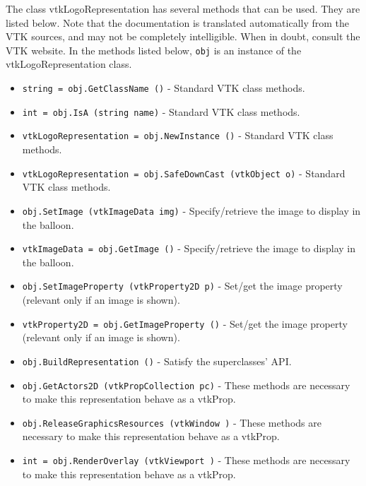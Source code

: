 The class vtkLogoRepresentation has several methods that can be used.
  They are listed below.
Note that the documentation is translated automatically from the VTK sources,
and may not be completely intelligible.  When in doubt, consult the VTK website.
In the methods listed below, \verb|obj| is an instance of the vtkLogoRepresentation class.
\begin{itemize}
\item  \verb|string = obj.GetClassName ()| -  Standard VTK class methods.

\item  \verb|int = obj.IsA (string name)| -  Standard VTK class methods.

\item  \verb|vtkLogoRepresentation = obj.NewInstance ()| -  Standard VTK class methods.

\item  \verb|vtkLogoRepresentation = obj.SafeDownCast (vtkObject o)| -  Standard VTK class methods.

\item  \verb|obj.SetImage (vtkImageData img)| -  Specify/retrieve the image to display in the balloon.

\item  \verb|vtkImageData = obj.GetImage ()| -  Specify/retrieve the image to display in the balloon.

\item  \verb|obj.SetImageProperty (vtkProperty2D p)| -  Set/get the image property (relevant only if an image is shown).

\item  \verb|vtkProperty2D = obj.GetImageProperty ()| -  Set/get the image property (relevant only if an image is shown).

\item  \verb|obj.BuildRepresentation ()| -  Satisfy the superclasses' API.

\item  \verb|obj.GetActors2D (vtkPropCollection pc)| -  These methods are necessary to make this representation behave as
 a vtkProp.

\item  \verb|obj.ReleaseGraphicsResources (vtkWindow )| -  These methods are necessary to make this representation behave as
 a vtkProp.

\item  \verb|int = obj.RenderOverlay (vtkViewport )| -  These methods are necessary to make this representation behave as
 a vtkProp.

\end{itemize}
